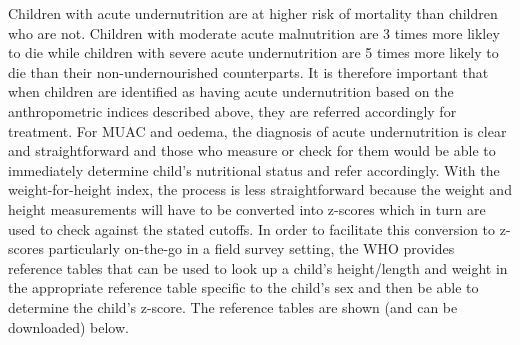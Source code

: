 \documentclass[12pt,]{book}
\theoremstyle{definition}
\theoremstyle{definition}
\theoremstyle{definition}
\theoremstyle{remark}
\begin{document}
Children with acute undernutrition are at higher risk of mortality than
children who are not. Children with moderate acute malnutrition are 3
times more likley to die while children with severe acute undernutrition
are 5 times more likely to die than their non-undernourished
counterparts. It is therefore important that when children are
identified as having acute undernutrition based on the anthropometric
indices described above, they are referred accordingly for treatment.
For MUAC and oedema, the diagnosis of acute undernutrition is clear and
straightforward and those who measure or check for them would be able to
immediately determine child's nutritional status and refer accordingly.
With the weight-for-height index, the process is less straightforward
because the weight and height measurements will have to be converted
into z-scores which in turn are used to check against the stated
cutoffs. In order to facilitate this conversion to z-scores particularly
on-the-go in a field survey setting, the WHO provides reference tables
that can be used to look up a child's height/length and weight in the
appropriate reference table specific to the child's sex and then be able
to determine the child's z-score. The reference tables are shown (and
can be downloaded) below.
\end{document}
